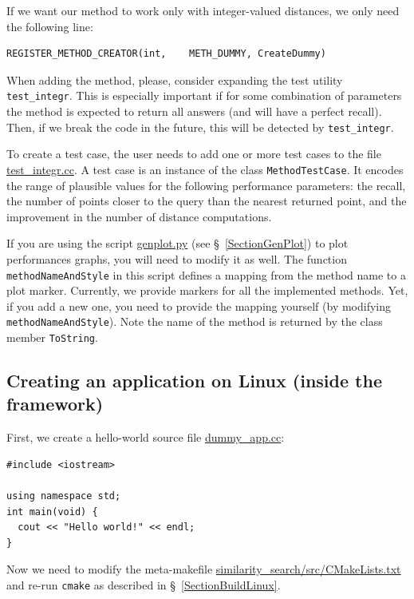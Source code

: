 \documentclass[runningheads,a4paper]{llncs}
\newcommand{\replocfile}{https://github.com/searchivarius/NonMetricSpaceLib/blob/pserv/}
\newcommand{\ttt}[1]{\texttt{#1}}
\begin{document}
If we want our method to work only with integer-valued distances,
we only need the following line:
\begin{verbatim}
REGISTER_METHOD_CREATOR(int,    METH_DUMMY, CreateDummy)
\end{verbatim}

When adding the method, please, consider expanding
the test utility \ttt{test\_integr}.
This is especially important if for some combination of parameters the method is expected
to return all answers (and will have a perfect recall). Then, if we break the code in the future,
this will be detected by \ttt{test\_integr}.

To create a test case, the user needs to add one or more test cases 
to the file
\href{\replocfile similarity_search/test/test_integr.cc#L65}{test\_integr.cc}. 
A test case is an instance of the class \ttt{MethodTestCase}. 
It encodes the range of plausible values
for the following performance parameters: the recall,
the number of points closer to the query than the nearest returned point,
and the improvement in the number of distance computations.

If you are using the script  \href{\replocfile sample_scripts/genplot.py#L222}{genplot.py} (see \S~\ref{SectionGenPlot}) to plot performances graphs, you will need to modify it as well.
The function \ttt{methodNameAndStyle} in this script defines a mapping from the method name
to a plot marker. Currently, we provide markers for all the implemented methods. 
Yet, if you add a new one, you need to provide the mapping yourself (by modifying \ttt{methodNameAndStyle}).
Note the name of the method is returned by the class member \ttt{ToString}.

\subsection{Creating an application on Linux (inside the framework)}\label{SectionCreateAppLinux}
First, we create a hello-world source file 
\href{\replocfile similarity_search/src/dummy_app.cc}{dummy\_app.cc}:
\begin{verbatim}
#include <iostream>

using namespace std;
int main(void) {
  cout << "Hello world!" << endl;
}
\end{verbatim}
Now we need to modify the meta-makefile
\href{\replocfile similarity_search/src/CMakeLists.txt}{similarity\_search/src/CMakeLists.txt} and 
re-run \ttt{cmake} as described in \S~\ref{SectionBuildLinux}.
\end{document}
